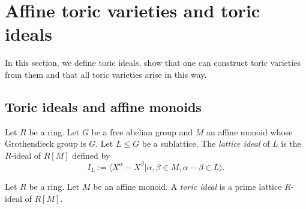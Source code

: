 \section{Affine toric varieties and toric ideals}


In this section, we define toric ideals, show that one can construct toric varieties from them
and that all toric varieties arise in this way.


\subsection{Toric ideals and affine monoids}


\begin{definition}
  \label{1-1-10-lat-ideal}
  \uses{}
  \leanok

  Let $R$ be a ring.
  Let $G$ be a free abelian group and $M$ an affine monoid whose Grothendieck group is $G$.
  Let $L \le G$ be a sublattice.
  The \emph{lattice ideal} of $L$ is the $R$-ideal of $R[M]$ defined by
  \[
    I_L := \langle X^\alpha - X^\beta | \alpha, \beta \in M, \alpha - \beta \in L\rangle.
  \]
\end{definition}


\begin{definition}
  \label{1-1-10-tor-ideal}
  \leanok

  Let $R$ be a ring. Let $M$ be an affine monoid.
  A \emph{toric ideal} is a prime lattice $R$-ideal of $R[M]$.
\end{definition}


